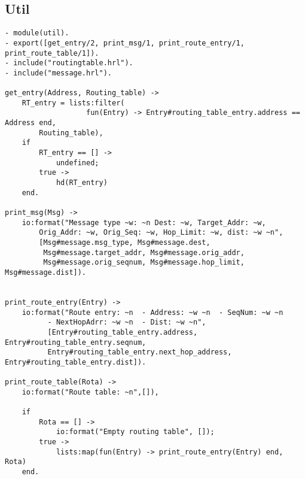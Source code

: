 \subsection*{Util}

\footnotesize
\begin{verbatim}
- module(util).
- export([get_entry/2, print_msg/1, print_route_entry/1, print_route_table/1]).
- include("routingtable.hrl").
- include("message.hrl").

get_entry(Address, Routing_table) ->
    RT_entry = lists:filter(
                   fun(Entry) -> Entry#routing_table_entry.address == Address end,
        Routing_table),
    if
        RT_entry == [] ->
            undefined;
        true ->
            hd(RT_entry)
    end.
      
print_msg(Msg) ->
    io:format("Message type ~w: ~n Dest: ~w, Target_Addr: ~w, 
        Orig_Addr: ~w, Orig_Seq: ~w, Hop_Limit: ~w, dist: ~w ~n",
        [Msg#message.msg_type, Msg#message.dest, 
         Msg#message.target_addr, Msg#message.orig_addr, 
         Msg#message.orig_seqnum, Msg#message.hop_limit, Msg#message.dist]).


print_route_entry(Entry) ->
    io:format("Route entry: ~n  - Address: ~w ~n  - SeqNum: ~w ~n 
          - NextHopAdrr: ~w ~n  - Dist: ~w ~n", 
          [Entry#routing_table_entry.address, Entry#routing_table_entry.seqnum,
          Entry#routing_table_entry.next_hop_address, Entry#routing_table_entry.dist]).

print_route_table(Rota) ->
    io:format("Route table: ~n",[]),
    
    if
        Rota == [] ->
            io:format("Empty routing table", []);
        true ->
            lists:map(fun(Entry) -> print_route_entry(Entry) end, Rota)
    end.

\end{verbatim}
\normalsize